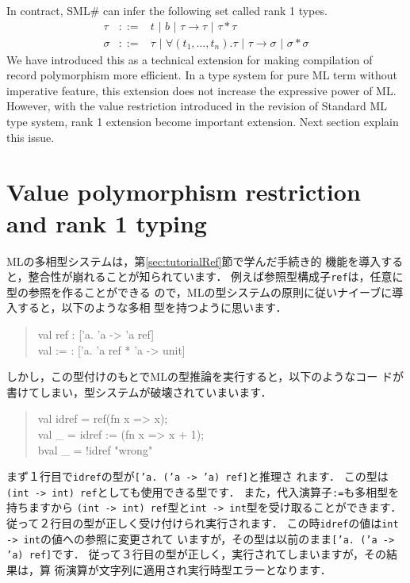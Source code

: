 \documentclass{jbook}
\newcommand{\txt}[2]{#2}
\newcommand{\smlsharp}{SML\#}
\newcommand{\func}{\rightarrow}
\newcommand{\vbar}{\mbox{\ |\ }}
\newenvironment{program}{\begin{tt}\begin{quote}}{\end{quote}\end{tt}}
\begin{document}
	In contract, \smlsharp{} can infer the following set called rank
1 types.
\begin{eqnarray*}
\tau &::=& t \vbar b \vbar \tau \func \tau \vbar \tau * \tau
\\
\sigma &::=& \tau \vbar \forall (t_1,\ldots,t_n).\tau 
\vbar \tau \func \sigma
\vbar \sigma * \sigma 
\end{eqnarray*}
	We have introduced this as a technical extension for making 
compilation of record polymorphism  more efficient.
	In a type system for pure ML term without imperative feature,
this extension does not increase the expressive power of ML.
	However, with the value restriction introduced in the revision
of Standard ML type system, rank 1 extension become important extension.
	Next section explain this issue.
\fi%

\section{\txt{ランク１多相性による値多相性制約の緩和}
{Value polymorphism restriction and rank 1 typing}
}
\label{sec:extensionValuerestriction}

\ifx\jp%
	MLの多相型システムは，第\ref{sec:tutorialRef}節で学んだ手続き的
機能を導入すると，整合性が崩れることが知られています．
	例えば参照型構成子{\tt ref}は，任意に型の参照を作ることができる
ので，MLの型システムの原則に従いナイーブに導入すると，以下のような多相
型を持つように思います．
\begin{program}
val ref : ['a. 'a -> 'a ref]\\
val := :  ['a. 'a ref * 'a -> unit]
\end{program}
	しかし，この型付けのもとでMLの型推論を実行すると，以下のようなコー
ドが書けてしまい，型システムが破壊されていまいます．
\begin{program}
val idref = ref(fn x => x);\\
val \_ = idref := (fn x => x + 1);\\
bval \_ = !idref "wrong"
\end{program}
	まず１行目で{\tt idref}の型が{\tt ['a. ('a -> 'a) ref]}と推理さ
れます．
	この型は{\tt (int -> int) ref}としても使用できる型です．
	また，代入演算子{\tt :=}も多相型を持ちますから
{\tt (int -> int) ref}型と{\tt int -> int}型を受け取ることができます．
	従って２行目の型が正しく受け付けられ実行されます．
	この時{\tt idref}の値は{\tt int -> int}の値への参照に変更されて
いますが，その型は以前のまま{\tt ['a. ('a -> 'a) ref]}です．
	従って３行目の型が正しく，実行されてしまいますが，その結果は，算
術演算が文字列に適用され実行時型エラーとなります．
\end{document}

